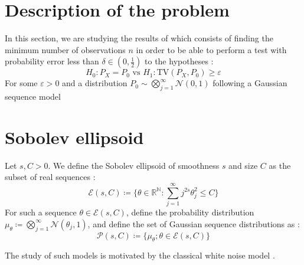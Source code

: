 \section{Description of the problem}
In this section, we are studying the results of \cite{gerberclas} which consists of finding the minimum number of observations $n$ 
in order to be able to perform a test with probability error less than $\delta \in (0,\frac{1}{2})$ to the hypotheses : 
\begin{equation*}
    H_0 : P_X = P_0 \text{ vs } H_1 : \text{TV}(P_X,P_0) \geq \varepsilon
\end{equation*}
For some $\varepsilon > 0$ and a distribution $P_0 \sim \bigotimes_{j=1}^\infty \mathcal{N}(0,1)$ following a Gaussian sequence model
\section{Sobolev ellipsoid}
\begin{definition}
    Let $s,C >0$. We define the Sobolev ellipsoid of smoothness $s$ and size $C$ as the subset of real sequences : 
    \begin{equation*}
        \mathcal{E}(s,C) \coloneqq \{\theta \in \mathbb{R}^\mathbb{N} : \sum_{j=1}^\infty j^{2s}\theta_j^2 \leq C \}
    \end{equation*}
    For such a sequence $\theta \in \mathcal{E}(s,C)$, define the probability distribution  $\mu_\theta  \coloneqq \bigotimes_{j=1}^\infty \mathcal{N}(\theta_j,1)$, and define the set of Gaussian sequence distributions as : 
    \begin{equation*}
        \mathcal{P}(s,C) \coloneqq \{\mu_\theta ; \theta \in \mathcal{E}(s,C)\}
    \end{equation*}
\end{definition}
The study of such models is motivated by the classical white noise model \cite{polyanskiy2025information}.

